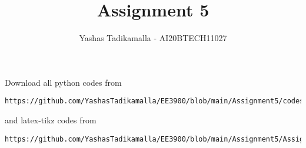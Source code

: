 \documentclass[journal,12pt,twocolumn]{IEEEtran}
\DeclareMathOperator*{\Res}{Res}
\begin{document}
\newcommand{\BEQA}{\begin{eqnarray}}
\newcommand{\EEQA}{\end{eqnarray}}
\newcommand{\define}{\stackrel{\triangle}{=}}

\raggedbottom
\setlength{\parindent}{0pt}
\providecommand{\mbf}{\mathbf}
\providecommand{\pr}[1]{\ensuremath{\Pr\left(#1\right)}}
\providecommand{\qfunc}[1]{\ensuremath{Q\left(#1\right)}}
\providecommand{\sbrak}[1]{\ensuremath{{}\left[#1\right]}}
\providecommand{\lsbrak}[1]{\ensuremath{{}\left[#1\right.}}
\providecommand{\rsbrak}[1]{\ensuremath{{}\left.#1\right]}}
\providecommand{\brak}[1]{\ensuremath{\left(#1\right)}}
\providecommand{\lbrak}[1]{\ensuremath{\left(#1\right.}}
\providecommand{\rbrak}[1]{\ensuremath{\left.#1\right)}}
\providecommand{\cbrak}[1]{\ensuremath{\left\{#1\right\}}}
\providecommand{\lcbrak}[1]{\ensuremath{\left\{#1\right.}}
\providecommand{\rcbrak}[1]{\ensuremath{\left.#1\right\}}}
\theoremstyle{remark}
\newtheorem{rem}{Remark}
\newtheorem*{remark}{Remark}
\newcommand{\sgn}{\mathop{\mathrm{sgn}}}
\providecommand{\abs}[1]{\vert#1\vert}
\providecommand{\res}[1]{\Res\displaylimits_{#1}} 
\providecommand{\norm}[1]{\lVert#1\rVert}
\providecommand{\mtx}[1]{\mathbf{#1}}
\providecommand{\mean}[1]{E[ #1 ]}
\providecommand{\fourier}{\overset{\mathcal{F}}{ \rightleftharpoons}}
\providecommand{\system}{\overset{\mathcal{H}}{ \longleftrightarrow}}
\newcommand{\solution}{\noindent \textbf{Solution: }}
\newcommand{\cosec}{\,\text{cosec}\,}
\providecommand{\dec}[2]{\ensuremath{\overset{#1}{\underset{#2}{\gtrless}}}}
\newcommand{\myvec}[1]{\ensuremath{\begin{pmatrix}#1\end{pmatrix}}}
\newcommand{\mydet}[1]{\ensuremath{\begin{vmatrix}#1\end{vmatrix}}}
\makeatletter
{}
\makeatother
\let\StandardTheFigure\thefigure
\let\vec\mathbf
\renewcommand{\thefigure}{\theproblem}
\def\putbox#1#2#3{\makebox[0in][l]{\makebox[#1][l]{}\raisebox{\baselineskip}[0in][0in]{\raisebox{#2}[0in][0in]{#3}}}}
     \def\rightbox#1{\makebox[0in][r]{#1}}
     \def\centbox#1{\makebox[0in]{#1}}
     \def\topbox#1{\raisebox{-\baselineskip}[0in][0in]{#1}}
     \def\midbox#1{\raisebox{-0.5\baselineskip}[0in][0in]{#1}}
\vspace{3cm}
\title{Assignment 5}
\author{Yashas Tadikamalla - AI20BTECH11027}
\maketitle
\newpage
\bigskip
\renewcommand{\thefigure}{\theenumi}
\renewcommand{\thetable}{\theenumi}
Download all python codes from 
\begin{lstlisting}
https://github.com/YashasTadikamalla/EE3900/blob/main/Assignment5/codes
\end{lstlisting}
%
and latex-tikz codes from 
%
\begin{lstlisting}
https://github.com/YashasTadikamalla/EE3900/blob/main/Assignment5/Assignment5.tex
\end{lstlisting}
\end{document}
